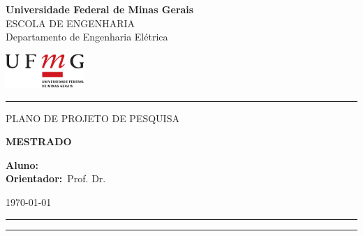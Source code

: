 \thispagestyle{empty}

\noindent
\begin{minipage}{0.8\linewidth}
  {\Large\bf Universidade Federal de Minas Gerais}\\
  {\small ESCOLA DE ENGENHARIA}\\
  {\sc Departamento de Engenharia Elétrica}
\end{minipage} 
\hfill 
\begin{minipage}{3cm}
  \includegraphics[width=3cm]{ufmg_ext.pdf}
\end{minipage}

\vspace{1mm}

\noindent
\hrule

\vspace{2.0cm}

\vfill

\begin{center}
  \Large PLANO DE PROJETO DE PESQUISA
\end{center}

\vfill

\begin{center}
  \Large\textbf{MESTRADO}
\end{center}

\vfill

\begin{center}
  \LARGE \bf \tituloProjeto
\end{center}

\vfill

\begin{flushright}
\begin{minipage}{12.0cm}
{\bf Aluno:} \nomeAluno \\
{\bf Orientador:}~Prof. Dr. \nomeOrientador \\
\end{minipage}
\end{flushright}

\vfill

\begin{center}
  \today
\end{center}

\vfill

\noindent
\rule{6cm}{0.25mm} \hspace{4cm} \rule{6cm}{0.25mm}\\

\noindent
\hspace{0.50cm} \nomeAluno \hspace{5.5cm} \nomeOrientador

\newpage